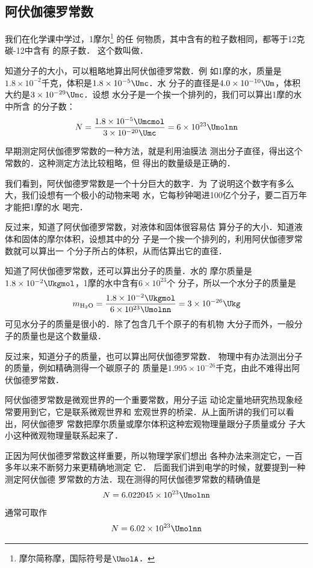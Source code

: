 \subsection{阿伏伽德罗常数}

我们在化学课中学过，1摩尔\footnote{摩尔简称摩，国际符号是$\UmolA$．}
的任
何物质，其中含有的粒子数相同，都等于12克碳-12中含有
的原子数．
这个数叫做．

    知道分子的大小，可以粗略地算出阿伏伽德罗常数．例
如1摩的水，质量是$1.8\times 10^{-2}$千克，体积是$1.8\times 10^{-5} \Umc $．水
分子的直径是$4.0\times 10^{-10} \Um $，体积大约是$3\times 10^{-29} \Umc $．设想
水分子是一个挨一个排列的，我们可以算出1摩的水中所含
的分子数：
\[N=\frac{1.8\times 10^{-5} \Umcmol }{3\times 10^{-20} \Umc }=6\times 10^{23} \Umolnn \]

    早期测定阿伏伽德罗常数的一种方法，就是利用油膜法
测出分子直径，得出这个常数的．这种测定方法比较粗略，但
得出的数量级是正确的．

    我们看到，阿伏伽德罗常数是一个十分巨大的数字．为
了说明这个数字有多么大，我们设想有一个极小的动物来喝
水，它每秒钟喝进100亿个分子，要二百万年才能把1摩的水
喝完．

    反过来，知道了阿伏伽德罗常数，对液体和固体很容易估
算分子的大小．知道液体和固体的摩尔体积，设想其中的分
子是一个挨一个排列的，利用阿伏伽德罗常数就可以算出一
个分子所占的体积，从而估算出它的直径．

    知道了阿伏伽德罗常数，还可以算出分子的质量．水的
摩尔质量是$1.8\times 10^{-2} \Ukgmol $，1摩的水中含有$6\times 10^{23}$个
分子，所以一个水分子的质量是
\[m_{\rm H_2 O}=\frac{1.8\times 10^{-2}  \Ukgmol }{6\times 10^{23} \Umolnn }=3\times 10^{-26} \Ukg \]
可见水分子的质量是很小的．除了包含几千个原子的有机物
大分子而外，一般分子的质量也是这个数量级．

    反过来，知道分子的质量，也可以算出阿伏伽德罗常数．
物理中有办法测出分子的质量，例如精确测得一个碳原子的
质量是$1.995\times 10^{-26}$千克，由此不难得出阿伏伽德罗常数．

    阿伏伽德罗常数是微观世界的一个重要常数，用分子运
动论定量地研究热现象经常要用到它，它是联系微观世界和
宏观世界的桥梁．从上面所讲的我们可以看出，阿伏伽德罗
常数把摩尔质量或摩尔体积这种宏观物理量跟分子质量或分
子大小这种微观物理量联系起来了．

    正因为阿伏伽德罗常数这样重要，所以物理学家们想出
各种办法来测定它，一百多年以来不断努力来更精确地测定
它．
后面我们讲到电学的时候，就要提到一种测定阿伏伽德
罗常数的方法．现在测得的阿伏伽德罗常数的精确值是
\[N=6.022045\times 10^{23} \Umolnn \]
通常可取作
\[N=6.02\times 10^{23} \Umolnn \]

